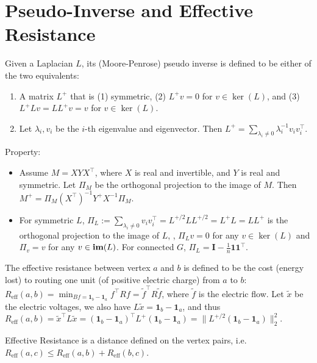 \section{Pseudo-Inverse and Effective Resistance}

Given a Laplacian $L$, its (Moore-Penrose) pseudo inverse is defined to be either of the two equivalents:
\begin{enumerate}
    \item A matrix $L^+$ that is (1) symmetric, (2) $L^+ v=0$ for $v \in \ker(L)$, and (3) $L^+ L v = L L^+ v = v$ for  $v \in \ker(L)$.
    \item Let $\lambda_i, v_i$ be the $i$-th eigenvalue and eigenvector. Then $L^+ = \sum_{\lambda_i \ne 0} \lambda_i^{-1} v_i v_i^\top$.
\end{enumerate}

Property:
\begin{itemize}
    \item Assume $M=X Y X^\top$, where $X$ is real and invertible, and $Y$ is real and symmetric. Let $\Pi_M$ be the orthogonal projection to the image of $M$. Then $M^+ = \Pi_M (X^\top)^{-1} Y^+ X^{-1} \Pi_M$.
    \item For symmetric $L$, $\Pi_L:= \sum_{\lambda_i \ne 0} v_i v_i^\top =  L^{+/2} L L^{+/2} = L^+ L = L L^+$ is the orthogonal projection to the image of $L$, \ie, $\Pi_L v = 0$ for any $v \in \ker(L)$ and $\Pi_v = v$ for any $v \in \operatorname{\textbf{im}}(L)$. For connected $G$, $\Pi_{L} = \boldsymbol{I} - \frac{1}{n} \boldsymbol{1} \boldsymbol{1}^\top$.
\end{itemize}

The effective resistance between vertex $a$ and $b$ is defined to be the cost (energy lost) to routing one unit (of positive electric charge) from $a$ to $b$: $R_{\text{eff}}(a,b) = \min_{Bf = \boldsymbol{1}_b - \boldsymbol{1}_a} f^\top R f = \tilde{f}^\top R \tilde{f}$, where $\tilde{f}$ is the electric flow. Let $\tilde{x}$ be the electric voltages, we also have $L\tilde{x} = \boldsymbol{1}_b - \boldsymbol{1}_a$, and thus $R_{\text{eff}}(a,b) = \tilde{x}^\top L \tilde{x} = (\boldsymbol{1}_b - \boldsymbol{1}_a)^\top L^+ (\boldsymbol{1}_b - \boldsymbol{1}_a) = \|L^{+/2} (\boldsymbol{1}_b - \boldsymbol{1}_a)\|_2^2$.

Effective Resistance is a distance defined on the vertex pairs, i.e. $R_{\text{eff}}(a,c) \le R_{\text{eff}}(a,b) + R_{\text{eff}}(b,c)$.